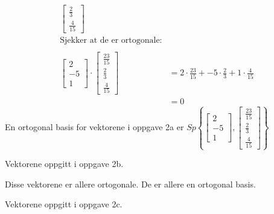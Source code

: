 \documentclass[11pt, a4paper, norsk]{NTNUoving}
\begin{document}
\begin{oppgave}
\begin{punkt}
\begin{align*}
\begin{bmatrix}
                                   \frac{2}{3} \\
                                   \frac{4}{15}
                               \end{bmatrix}
                               \\
                               \text{Sjekker at de er ortogonale:}
                               \\
                               \\
                               \begin{bmatrix}
                                   2 \\
                                   -5 \\
                                   1
                               \end{bmatrix} \cdot \begin{bmatrix}
                                   \frac{23}{15} \\
                                   \frac{2}{3} \\
                                   \frac{4}{15}
                               \end{bmatrix} &= 2 \cdot \frac{23}{15} + -5 \cdot \frac{2}{3} + 1 \cdot \frac{4}{15}
                               \\
                               &= 0
           \end{align*}
           En ortogonal basis for vektorene i oppgave 2a er $Sp\left\{\begin{bmatrix}
               2 \\
               -5 \\
               1
           \end{bmatrix}, \begin{bmatrix}
               \frac{23}{15} \\
               \frac{2}{3} \\
               \frac{4}{15}
           \end{bmatrix}\right\}$
       \end{punkt}
       \begin{punkt}
           Vektorene oppgitt i oppgave 2b.

           Disse vektorene er allere ortogonale. De er allere en ortogonal basis.
       \end{punkt}
       \begin{punkt}
            Vektorene oppgitt i oppgave 2c.


\end{punkt}
\end{oppgave}
\end{document}
